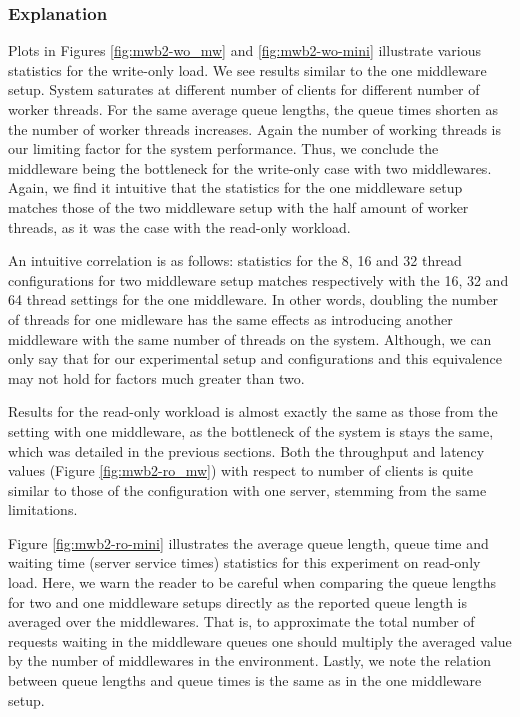 \documentclass[11pt,a4paper]{article}
\begin{document}
\subsubsection{Explanation} \label{sec:mwb2-exp}
Plots in Figures \ref{fig:mwb2-wo_mw} and \ref{fig:mwb2-wo-mini} illustrate various statistics for the write-only load. We see results similar to the one middleware setup. System saturates at different number of clients for different number of worker threads. For the same average queue lengths, the queue times shorten as the number of worker threads increases. Again the number of working threads is our limiting factor for the system performance. Thus, we conclude the middleware being the bottleneck for the write-only case with two middlewares. Again, we find it intuitive that the statistics for the one middleware setup matches those of the two middleware setup with the half amount of worker threads, as it was the case with the read-only workload.
\par An intuitive correlation is as follows: statistics for the 8, 16 and 32 thread configurations for two middleware setup matches respectively with the 16, 32 and 64 thread settings for the one middleware. In other words, doubling the number of threads for one midleware has the same effects as introducing another middleware with the same number of threads on the system. Although, we can only say that for our experimental setup and configurations and this equivalence may not hold for factors much greater than two.
\par Results for the read-only workload is almost exactly the same as those from the setting with one middleware, as the bottleneck of the system is stays the same, which was detailed in the previous sections. Both the throughput and latency values (Figure \ref{fig:mwb2-ro_mw}) with respect to number of clients is quite similar to those of the configuration with one server, stemming from the same limitations.
\par Figure \ref{fig:mwb2-ro-mini} illustrates the average queue length, queue time and waiting time (server service times) statistics for this experiment on read-only load. Here, we warn the reader to be careful when comparing the queue lengths for two and one middleware setups directly as the reported queue length is averaged over the middlewares. That is, to approximate the total number of requests waiting in the middleware queues one should multiply the averaged value by the number of middlewares in the environment. Lastly, we note the relation between queue lengths and queue times is the same as in the one middleware setup.
\end{document}
